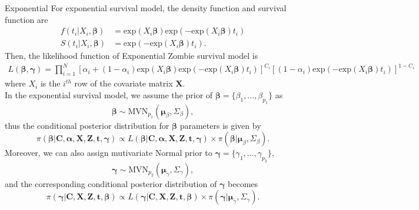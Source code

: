 \documentclass[a4paper, 12pt]{article}
\makeatletter
\newcommand {\dprod}{\displaystyle \prod}
\renewcommand{\subsection}{\@startsection
	{subsection}    {2}    {0mm}    {-0.5\baselineskip}    {0.01\baselineskip}    {\normalfont\normalsize\itshape\center}}
\makeatother
\begin{document}
\subsection{Exponential}
\noindent 
For exponential survival model, the density function and survival function are
\begin{equation}
\begin{aligned}
f(t_i|X_i, \mathbf{\beta}) &= \mbox{exp}(X_i\mathbf{\beta})\mbox{exp}(- \mbox{exp}(X_i\mathbf{\beta})t_i)\\
S(t_i|X_i, \mathbf{\beta}) &= \mbox{exp}(- \mbox{exp}(X_i\mathbf{\beta})t_i).
\end{aligned}
\end{equation}
Then, the likelihood function of Exponential Zombie survival model is
\begin{equation}
\begin{aligned}
L(\mathbf{\beta}, \mathbf{\gamma})=\dprod\limits_{i=1}^{N}[\alpha _{i}+(1-\alpha _{i})\mbox{exp}(X_i\mathbf{\beta})\mbox{exp}(- \mbox{exp}(X_i\mathbf{\beta})t_i)]^{C_{i}}[(1-\alpha _{i})\mbox{exp}(- \mbox{exp}(X_i\mathbf{\beta})t_i)]^{1-C_{i}}
\end{aligned}
\end{equation}
where $X_i$ is the $i^{th}$ row of the covariate matrix $\mathbf{X}$.\\ \newline
In the exponential survival model, we assume the prior of $\mathbf{\beta}=\{\beta_1,...,\beta_{p_1}\}$ as
\begin{equation}
\mathbf{\beta} \sim \mbox{MVN}_{p_1}(\mathbf{\mu}_{\beta}, \Sigma_{\beta}),
\end{equation}
thus the conditional posterior distribution for $\mathbf{\beta}$ parameters is given by
\begin{equation}
\pi(\mathbf{\beta}|\mathbf{C}, \mathbf{\alpha}, \mathbf{X}, \mathbf{Z}, \mathbf{t}, \mathbf{\gamma}) \propto L(\mathbf{\beta}|\mathbf{C}, \mathbf{\alpha}, \mathbf{X}, \mathbf{Z}, \mathbf{t}, \mathbf{\gamma})\times \pi(\mathbf{\beta}|\mathbf{\mu}_{\beta}, \Sigma_{\beta}).
\end{equation}
Moreover, we can also assign mutivariate Normal prior to $\mathbf{\gamma}=\{\gamma_1,...,\gamma_{p_2}\}$,
\begin{equation}
\mathbf{\gamma} \sim \mbox{MVN}_{p_2}(\mathbf{\mu}_{\gamma}, \Sigma_{\gamma}),
\end{equation}
and the corresponding conditional posterior distribution of $\mathbf{\gamma}$ becomes 
\begin{equation}
\pi(\mathbf{\gamma}|\mathbf{C}, \mathbf{X}, \mathbf{Z}, \mathbf{t}, \mathbf{\beta}) \propto L(\mathbf{\gamma}|\mathbf{C}, \mathbf{X}, \mathbf{Z}, \mathbf{t}, \mathbf{\beta})\times \pi(\mathbf{\gamma}|\mathbf{\mu}_{\gamma}, \Sigma_{\gamma}).
\end{equation}
\end{document}
